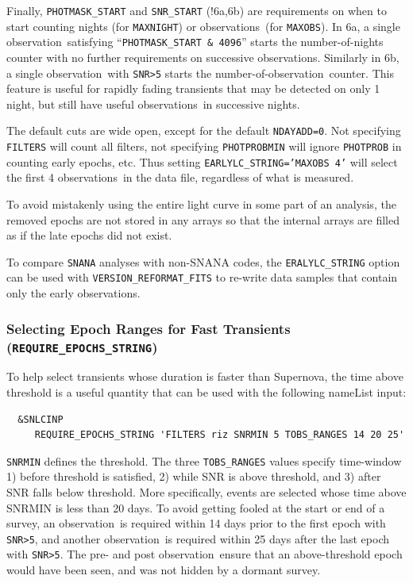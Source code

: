 \documentclass[12pt]{article}
\newcommand{\obs}{observation}
\newcommand{\obss}{observations}
\begin{document}
Finally, {\tt PHOTMASK\_START} and {\tt SNR\_START} (!6a,6b) 
are requirements on when to start counting nights 
(for {\tt MAXNIGHT}) or \obss\ (for {\tt MAXOBS}).
In 6a, a single \obs\ satisfying 
``{\tt PHOTMASK\_START \& 4096}'' starts the number-of-nights 
counter with no further requirements on successive \obss.
Similarly in 6b, a single \obs\ with {\tt SNR>5} starts
the number-of-\obs\ counter.
This feature is useful for rapidly fading transients that may
be detected on only 1 night, but still have useful \obss\ in
successive nights.

The default cuts are wide open, except for the default {\tt NDAYADD=0}.
Not specifying {\tt FILTERS} will count all filters, 
not specifying {\tt PHOTPROBMIN} will
ignore {\tt PHOTPROB} in counting early epochs, etc.
Thus setting {\tt EARLYLC\_STRING='MAXOBS 4'} will select the
first 4 \obss\ in the data file, regardless of what
is measured.

To avoid mistakenly using the entire light curve in some 
part of an analysis,  the removed epochs are not stored 
in any arrays so that the internal arrays are filled
as if the late epochs did not exist.

To compare {\tt SNANA} analyses with non-SNANA codes, 
the  \verb|ERALYLC_STRING| option can be used with 
\verb|VERSION_REFORMAT_FITS| to re-write data samples
that contain only the early observations.


  \subsubsection{Selecting Epoch Ranges for Fast Transients 
      ({\tt REQUIRE\_EPOCHS\_STRING}) }
  \label{sss:reqep}

To help select transients whose duration is faster than Supernova,
the time above threshold is a useful quantity that can be used with
the following nameList input:
\begin{verbatim}
  &SNLCINP
     REQUIRE_EPOCHS_STRING 'FILTERS riz SNRMIN 5 TOBS_RANGES 14 20 25'
\end{verbatim}
%
{\tt SNRMIN} defines the threshold. The three {\tt TOBS\_RANGES}
values specify time-window 1) before threshold is satisfied, 2) while
SNR is above threshold, and 3) after SNR falls below threshold.
More specifically, events are selected whose time above SNRMIN
is less than 20 days. To avoid getting fooled at the start or end
of a survey, an \obs\ is required within 14 days prior to the first
epoch with {\tt SNR>5}, and another \obs\ is required within
25 days after the last epoch with {\tt SNR>5}. The pre- and post
\obs\ ensure that an above-threshold epoch would have been seen,
and was not hidden by a dormant survey.
\end{document}
